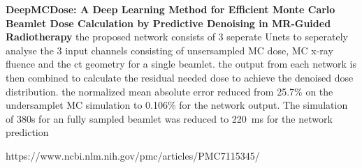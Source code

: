 \textbf{DeepMCDose: A Deep Learning Method for Efficient Monte Carlo Beamlet Dose Calculation by Predictive Denoising in MR-Guided Radiotherapy}
the proposed network consists of 3 seperate Unets to seperately analyse the 3 input channels consisting of unsersampled MC dose, MC x-ray fluence and the ct geometry for a single beamlet. the output from each network is then combined to calculate the residual needed dose to achieve the denoised dose distribution. the normalized mean absolute error reduced from 25.7\% on the undersamplet MC simulation to 0.106\% for the network output. The simulation of 380s for an fully sampled beamlet was reduced to 220 ms for the network prediction

https://www.ncbi.nlm.nih.gov/pmc/articles/PMC7115345/